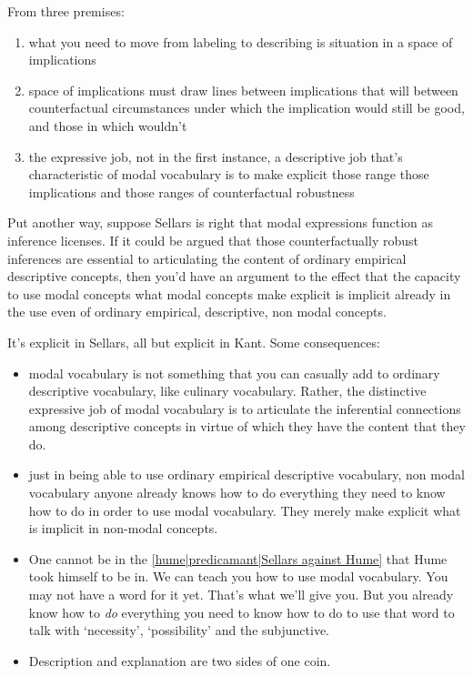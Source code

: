 From three premises:
\begin{enumerate}
\item what you need to move from labeling to describing is situation in a space of implications
\item space of implications must draw lines between implications that will between counterfactual circumstances under which the implication would still be good, and those in which wouldn't
\item the expressive job, not in the first instance, a descriptive job that's characteristic of modal vocabulary is to make explicit those range those implications and those ranges of counterfactual robustness
\end{enumerate}

Put another way, suppose Sellars is right that modal expressions function as inference licenses. If it could be argued that those counterfactually robust inferences are essential to articulating the content of ordinary empirical descriptive concepts, then you'd have an argument to the effect that the capacity to use modal concepts what modal concepts make explicit is implicit already in the use even of ordinary empirical, descriptive, non modal concepts.

It's explicit in Sellars, all but explicit in Kant. Some consequences:
\begin{itemize}

    \item modal vocabulary is not something that you can casually add to ordinary descriptive vocabulary, like culinary vocabulary. Rather, the distinctive expressive job of modal vocabulary is to articulate the inferential connections among descriptive concepts in virtue of which they have the content that they do.

    \item just in being able to use ordinary empirical descriptive vocabulary, non modal vocabulary anyone already knows how to do everything they need to know how to do in order to use modal vocabulary. They merely make explicit what is implicit in non-modal concepts.

    \item One cannot be in the \ref{hume|predicamant|Sellars against Hume} that Hume took himself to be in. We can teach you how to use modal vocabulary. You may not have a word for it yet. That's what we'll give you. But you already know how to \emph{do} everything you need to know how to do to use that word to talk with `necessity', `possibility' and the subjunctive.

    \item Description and explanation are two sides of one coin.
\end{itemize}

